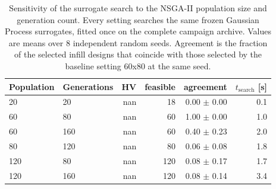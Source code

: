 \begin{table}[htbp]
\centering
\caption{Sensitivity of the surrogate search to the NSGA-II population size and generation count. Every setting searches the same frozen Gaussian Process surrogates, fitted once on the complete campaign archive. Values are means over 8 independent random seeds. Agreement is the fraction of the selected infill designs that coincide with those selected by the baseline setting 60x80 at the same seed.}
\label{tab:nsga_sensitivity}
\begin{tabular}{llrrrr}
\toprule
Population & Generations & HV & feasible & agreement & $t_{\mathrm{search}}$ [s] \\
\midrule
20 & 20 & nan & 18 & 0.00 $\pm$ 0.00 & 0.1 \\
60 & 80 & nan & 60 & 1.00 $\pm$ 0.00 & 1.0 \\
60 & 160 & nan & 60 & 0.40 $\pm$ 0.23 & 2.0 \\
80 & 120 & nan & 80 & 0.06 $\pm$ 0.08 & 1.8 \\
120 & 80 & nan & 120 & 0.08 $\pm$ 0.17 & 1.7 \\
120 & 160 & nan & 120 & 0.08 $\pm$ 0.14 & 3.4 \\
\bottomrule
\end{tabular}
\end{table}
